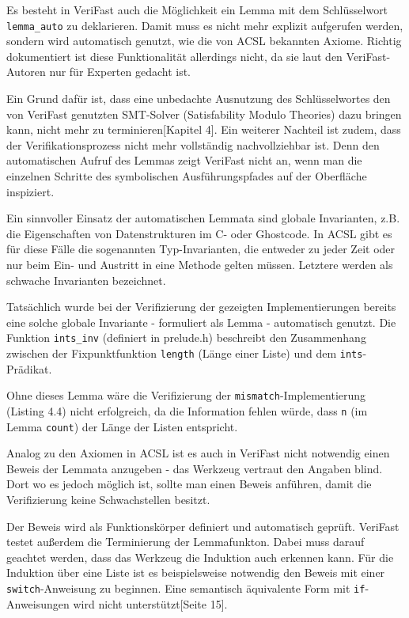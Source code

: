 Es besteht in VeriFast auch die Möglichkeit ein Lemma mit dem Schlüsselwort \lstinline{lemma_auto} zu deklarieren.
Damit muss es nicht mehr explizit aufgerufen werden, sondern wird automatisch genutzt, wie die von 
ACSL bekannten Axiome. Richtig dokumentiert ist diese Funktionalität allerdings nicht, da sie laut den VeriFast-Autoren
nur für Experten gedacht ist.

Ein Grund dafür ist, dass eine unbedachte Ausnutzung des Schlüsselwortes den von VeriFast genutzten 
SMT-Solver (Satisfability Modulo Theories) dazu bringen kann, nicht mehr zu terminieren\cite{jacobs-2010}[Kapitel 4]. Ein
weiterer Nachteil ist zudem, dass der Verifikationsprozess nicht mehr vollständig nachvollziehbar ist.
Denn den automatischen Aufruf des Lemmas zeigt VeriFast nicht an, wenn man die einzelnen
Schritte des symbolischen Ausführungspfades auf der Oberfläche inspiziert.

Ein sinnvoller Einsatz der automatischen Lemmata sind globale Invarianten, z.B. die Eigenschaften von Datenstrukturen
im C- oder Ghostcode. In ACSL gibt es für diese Fälle die sogenannten Typ-Invarianten, die entweder zu jeder Zeit oder
nur beim Ein- und Austritt in eine Methode gelten müssen. Letztere werden als schwache Invarianten bezeichnet.

Tatsächlich wurde bei der Verifizierung der gezeigten Implementierungen bereits eine solche
globale Invariante - formuliert als Lemma - automatisch genutzt. Die Funktion \lstinline{ints_inv}
(definiert in prelude.h) beschreibt den Zusammenhang zwischen der Fixpunktfunktion \texttt{length}
(Länge einer Liste) und dem \lstinline{ints}-Prädikat.



Ohne dieses Lemma wäre die Verifizierung der \lstinline{mismatch}-Implementierung (Listing 4.4)
nicht erfolgreich, da die Information fehlen würde, dass \lstinline{n} (im Lemma \lstinline{count})
der Länge der Listen entspricht.

Analog zu den Axiomen in ACSL ist es auch in VeriFast nicht notwendig einen Beweis der Lemmata anzugeben -
das Werkzeug vertraut den Angaben blind. Dort wo es jedoch möglich ist, sollte man einen Beweis anführen,
damit die Verifizierung keine Schwachstellen besitzt.

Der Beweis wird als Funktionskörper definiert und automatisch geprüft. VeriFast testet außerdem die
Terminierung der Lemmafunkton. 
Dabei muss darauf geachtet werden, dass das Werkzeug die Induktion auch erkennen kann. Für die Induktion 
über eine Liste ist es beispielsweise notwendig den Beweis mit einer 
\texttt{switch}-Anweisung zu beginnen. Eine semantisch äquivalente Form mit \texttt{if}-Anweisungen wird 
nicht unterstützt\cite{jacobs-tutorial}[Seite 15].

